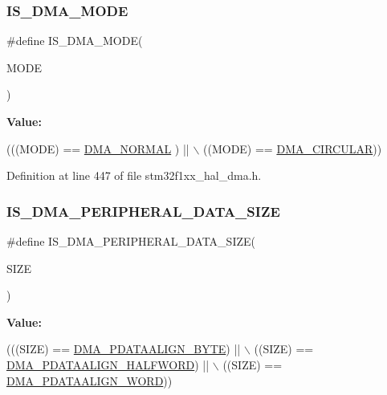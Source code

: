 \subsubsection{\texorpdfstring{I\+S\+\_\+\+D\+M\+A\+\_\+\+M\+O\+DE}{IS\_DMA\_MODE}}
{\footnotesize\ttfamily \#define I\+S\+\_\+\+D\+M\+A\+\_\+\+M\+O\+DE(\begin{DoxyParamCaption}\item[{}]{M\+O\+DE }\end{DoxyParamCaption})}

{\bfseries Value\+:}
\begin{DoxyCode}
(((MODE) == \hyperlink{group___d_m_a__mode_ga04941acfbbdefc53e1e08133cffa3b8a}{DMA\_NORMAL} )  || \(\backslash\)
                           ((MODE) == \hyperlink{group___d_m_a__mode_ga4c4f425cba13edffb3c831c036c91e01}{DMA\_CIRCULAR}))
\end{DoxyCode}


Definition at line 447 of file stm32f1xx\+\_\+hal\+\_\+dma.\+h.

\mbox{\label{group___d_m_a___private___macros_gad7916e0ae55cdf5efdfa68a09a028037}} 
\subsubsection{\texorpdfstring{I\+S\+\_\+\+D\+M\+A\+\_\+\+P\+E\+R\+I\+P\+H\+E\+R\+A\+L\+\_\+\+D\+A\+T\+A\+\_\+\+S\+I\+ZE}{IS\_DMA\_PERIPHERAL\_DATA\_SIZE}}
{\footnotesize\ttfamily \#define I\+S\+\_\+\+D\+M\+A\+\_\+\+P\+E\+R\+I\+P\+H\+E\+R\+A\+L\+\_\+\+D\+A\+T\+A\+\_\+\+S\+I\+ZE(\begin{DoxyParamCaption}\item[{}]{S\+I\+ZE }\end{DoxyParamCaption})}

{\bfseries Value\+:}
\begin{DoxyCode}
(((SIZE) == \hyperlink{group___d_m_a___peripheral__data__size_ga55b8c8f5ec95f10d26d6c5b1c9136730}{DMA\_PDATAALIGN\_BYTE})     || \(\backslash\)
                                           ((SIZE) == \hyperlink{group___d_m_a___peripheral__data__size_gac08bfd907442dba5358830b247135bcc}{DMA\_PDATAALIGN\_HALFWORD}) || \(\backslash\)
                                           ((SIZE) == \hyperlink{group___d_m_a___peripheral__data__size_gaad50e97cbc4a726660db9c3f42ac93b0}{DMA\_PDATAALIGN\_WORD}))
\end{DoxyCode}


